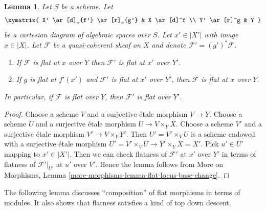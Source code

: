 \documentclass{stacks-project}
\theoremstyle{plain}
\newtheorem{lemma}[subsection]{Lemma}
\theoremstyle{definition}
\theoremstyle{remark}
\numberwithin{equation}{subsection}
\begin{document}
\begin{lemma}
\label{lemma-base-change-module-flat}
Let $S$ be a scheme. Let
$$
\xymatrix{
X' \ar[d]_{f'} \ar[r]_{g'} & X \ar[d]^f \\
Y' \ar[r]^g & Y
}
$$
be a cartesian diagram of algebraic spaces over $S$. Let $x' \in |X'|$
with image $x \in |X|$. Let $\mathcal{F}$ be a quasi-coherent
sheaf on $X$ and denote $\mathcal{F}' = (g')^*\mathcal{F}$.
\begin{enumerate}
\item If $\mathcal{F}$ is flat at $x$ over $Y$
then $\mathcal{F}'$ is flat at $x'$ over $Y'$.
\item If $g$ is flat at $f'(x')$ and
$\mathcal{F}'$ is flat at $x'$ over $Y'$, then
$\mathcal{F}$ is flat at $x$ over $Y$.
\end{enumerate}
In particular, if $\mathcal{F}$ is flat over $Y$, then
$\mathcal{F}'$ is flat over $Y'$.
\end{lemma}

\begin{proof}
Choose a scheme $V$ and a surjective \'etale morphism $V \to Y$.
Choose a scheme $U$ and a surjective \'etale morphism $U \to V \times_Y X$.
Choose a scheme $V'$ and a surjective \'etale morphism $V' \to V \times_Y Y'$.
Then $U' = V' \times_V U$ is a scheme endowed with a surjective \'etale
morphism $U' = V' \times_V U \to Y' \times_Y X = X'$. Pick $u' \in U'$
mapping to $x' \in |X'|$. Then we can check flatness of
$\mathcal{F}'$ at $x'$ over $Y'$ in terms of flatness of
$\mathcal{F}'|_{U'}$ at $u'$ over $V'$. Hence the lemma follows from
More on Morphisms, Lemma \ref{more-morphisms-lemma-flat-locus-base-change}.
\end{proof}

\noindent
The following lemma discusses ``composition'' of flat morphisms in
terms of modules. It also shows that flatness satisfies a kind of
top down descent.
\end{document}
